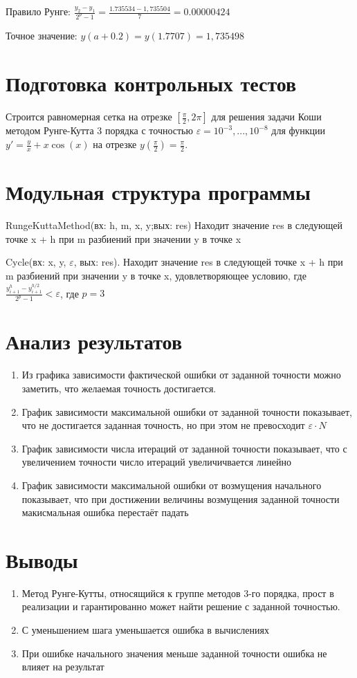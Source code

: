 \documentclass{article}
\begin{document}
	Правило Рунге: $\frac{y_2- y_1}{2^p-1} = \frac{1.735534 - 1,735504}{7} = 0.00000424$
	
	Точное значение: $y(a + 0.2) = y(1.7707) = 1,735498$
	\section{Подготовка контрольных тестов}
	\paragraph{}Строится равномерная сетка на отрезке $[\frac{\pi}{2}, 2\pi]$ для решения задачи Коши методом Рунге-Кутта 3 порядка с точностью $\varepsilon = 10^{-3}, ..., 10^{-8}$ для функции $y' = \frac{y}{x} + x\cos(x)$ на отрезке $y(\frac{\pi}{2}) = \frac{\pi}{2}$.

	\section{Модульная структура программы}
	RungeKuttaMethod(вх: h, m, x, y;вых: res) Находит значение res в следующей точке x + h при m разбиений при значении y в точке x
	
	Cycle(вх: x, y, $\varepsilon$, вых: res). Находит значение res в следующей точке x + h при m разбиений при значении y в точке x, удовлетворяющее условию, где $\frac{y^h_{i+1} - y^{h/2}_{i+1}}{2^p-1} < \varepsilon $, где $p=3$
	\section{Анализ результатов}
	\begin{enumerate}
		\item Из графика зависимости фактической ошибки от заданной точности можно заметить, что желаемая точность достигается. 
		\item График зависимости максимальной ошибки от заданной точности показывает, что не достигается заданная точность, но
		при этом не превосходит $\varepsilon \cdot N$
		\item График зависимости числа итераций от заданной точности
		показывает, что с увеличением точности число итераций
		увеличичвается линейно
		\item График зависимости максимальной ошибки от возмущения
		начального показывает, что при достижении величины возмущения заданной точности макисмальная ошибка перестаёт падать
	\end{enumerate}
	
	\section{Выводы}
	\begin{enumerate}
		\item Метод Рунге-Кутты, относящийся к группе методов 3-го порядка, прост в реализации и гарантированно может найти решение с заданной точностью.
		\item С уменьшением шага уменьшается ошибка в вычислениях
		\item  При ошибке начального значения меньше заданной точности ошибка не влияет на результат

	\end{enumerate}
	
\end{document}
